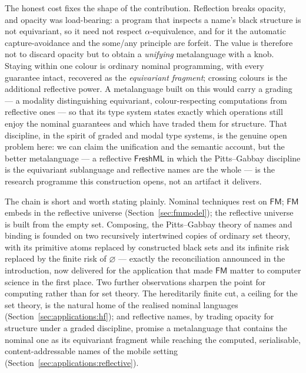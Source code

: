 The honest cost fixes the shape of the contribution. Reflection breaks opacity,
and opacity was load-bearing: a program that inspects a name's black structure is
not equivariant, so it need not respect $\alpha$-equivalence, and for it the
automatic capture-avoidance and the some/any principle are forfeit. The value is
therefore not to discard opacity but to obtain a \emph{unifying} metalanguage with
a knob. Staying within one colour is ordinary nominal programming, with every
guarantee intact, recovered as the \emph{equivariant fragment}; crossing colours
is the additional reflective power. A metalanguage built on this would carry a
grading --- a modality distinguishing equivariant, colour-respecting computations
from reflective ones --- so that its type system states exactly which operations
still enjoy the nominal guarantees and which have traded them for structure. That
discipline, in the spirit of graded and modal type systems, is the genuine open
problem here: we can claim the unification and the semantic account, but the
better metalanguage --- a reflective $\mathsf{FreshML}$ in which the
Pitts--Gabbay discipline is the equivariant sublanguage and reflective names are
the whole --- is the research programme this construction opens, not an artifact
it delivers.



The chain is short and worth stating plainly. Nominal techniques rest on
$\mathsf{FM}$; $\mathsf{FM}$ embeds in the reflective universe
(Section~\ref{sec:fmmodel}); the reflective universe is built from the empty set.
Composing, the Pitts--Gabbay theory of names and binding is founded on two
recursively intertwined copies of ordinary set theory, with its primitive atoms
replaced by constructed black sets and its infinite risk replaced by the finite
risk of $\varnothing$ --- exactly the reconciliation announced in the
introduction, now delivered for the application that made $\mathsf{FM}$ matter to
computer science in the first place. Two further observations sharpen the point
for computing rather than for set theory. The hereditarily finite cut, a ceiling
for the set theory, is the natural home of the realised nominal languages
(Section~\ref{sec:applications:hf}); and reflective names, by trading opacity for
structure under a graded discipline, promise a metalanguage that contains the
nominal one as its equivariant fragment while reaching the computed,
serialisable, content-addressable names of the mobile setting
(Section~\ref{sec:applications:reflective}).
